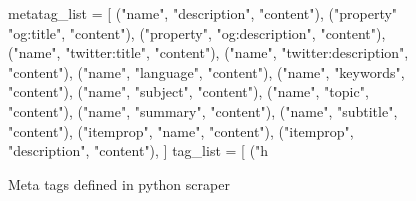 \documentclass{article}
\begin{document}
\begin{figure}[H]
\caption{Meta tags defined in python scraper}
\label{fig:python_metatags}
\begin{python}
metatag_list = [
    ("name", "description", "content"),
    ("property" "og:title", "content"),
    ("property", "og:description", "content"),
    ("name", "twitter:title", "content"),
    ("name", "twitter:description", "content"),
    ("name", "language", "content"),
    ("name", "keywords", "content"),
    ("name", "subject", "content"),
    ("name", "topic", "content"),
    ("name", "summary", "content"),
    ("name", "subtitle", "content"),
    ("itemprop", "name", "content"),
    ("itemprop", "description", "content"),
]
tag_list = [ ("h%
\end{python}
\end{figure}
\end{document}
